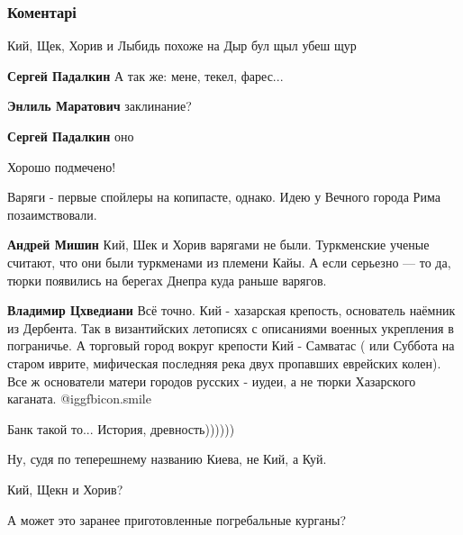  
 
 
 
 
\subsubsection{Коментарі}
\label{sec:28_10_2021.fb.dzhangirov_dmitrij.kiev.1.istoricheskaja_pravda.cmt}

\begin{itemize} %
Кий, Щек, Хорив и Лыбидь похоже на Дыр бул щыл убеш щур

\begin{itemize} %
\textbf{Сергей Падалкин} А так же: мене, текел, фарес...

\textbf{Энлиль Маратович} заклинание?

\textbf{Сергей Падалкин} оно
\end{itemize} %

Хорошо подмечено!

Варяги - первые спойлеры на копипасте, однако. Идею у Вечного города Рима позаимствовали.

\begin{itemize} %
\textbf{Андрей Мишин} Кий, Шек и Хорив варягами не были. Туркменские ученые считают, что они были туркменами из племени Кайы. А если серьезно — то да, тюрки появились на берегах Днепра куда раньше варягов.

\textbf{Владимир Цхведиани} Всё точно. Кий - хазарская крепость, основатель наёмник из Дербента. Так в византийских летописях с описаниями военных укрепления в пограничье. А торговый город вокруг крепости Кий - Самватас ( или Суббота на старом иврите, мифическая последняя река двух пропавших еврейских колен). Все ж основатели матери городов русских - иудеи, а не тюрки Хазарского каганата.  @igg{fbicon.smile} 
\end{itemize} %

Банк такой то... История, древность))))))

Ну, судя по теперешнему названию Киева, не Кий, а Куй.

Кий, Щекн и Хорив?

А может это заранее приготовленные погребальные курганы?

\end{itemize} %
